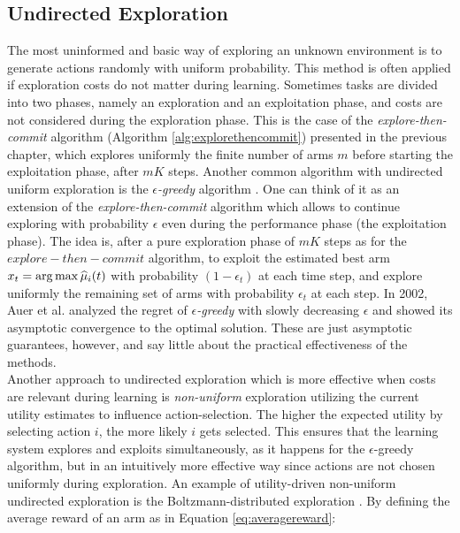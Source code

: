 \subsection{Undirected Exploration}
The most uninformed and basic way of exploring an unknown environment is to generate actions randomly with uniform probability. This method is often applied if exploration costs do not matter during learning. Sometimes tasks are divided into two phases, namely an exploration and an exploitation phase, and costs are not considered during the exploration phase. This is the case of the \emph{explore-then-commit} algorithm (Algorithm \ref{alg:explorethencommit}) presented in the previous chapter, which explores uniformly the finite number of arms $m$ before starting the exploitation phase, after $mK$ steps. Another common algorithm with undirected uniform exploration is the $\epsilon$\emph{-greedy} algorithm \cite{lattimore2019bandit}. One can think of it as an extension of the \emph{explore-then-commit} algorithm which allows to continue exploring with probability $\epsilon$ even during the performance phase (\ie the exploitation phase). The idea is, after a pure exploration phase of $mK$ steps as for the $explore-then-commit$ algorithm, to exploit the estimated best arm $x_t = \arg \max \widehat{\mu}_i(t)$ with probability $(1-\epsilon_t)$ at each time step, and explore uniformly the remaining set of arms with probability $\epsilon_t$ at each step. In 2002, Auer et al. \cite{auer2002finite} analyzed the regret of $\epsilon$\emph{-greedy} with slowly decreasing $\epsilon$ and showed its asymptotic convergence to the optimal solution. These are just asymptotic guarantees, however, and say little about the practical effectiveness of the methods.\\
Another approach to undirected exploration which is more effective when costs are relevant during learning is \emph{non-uniform} exploration utilizing the current utility estimates to influence action-selection. The higher the expected utility by selecting action $i$, the more likely $i$ gets selected. This ensures that the learning system explores and exploits simultaneously, as it happens for the $\epsilon$-greedy algorithm, but in an intuitively more effective way since actions are not chosen uniformly during exploration. An example of utility-driven non-uniform undirected exploration is the  Boltzmann-distributed exploration \cite{cesa2017boltzmann}. By defining the average reward of an arm as in Equation \ref{eq:averagereward}:

